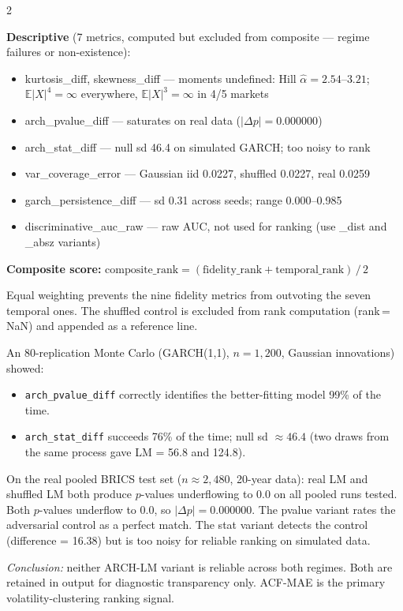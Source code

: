 \documentclass[10pt]{article}
\newcommand{\navybox}[2]{\begin{tcolorbox}[mybox={Navy}{LBg},title={#1}]#2\end{tcolorbox}}
\newcommand{\E}{\mathbb{E}}
\begin{document}
\begin{multicols}{2}
{\textbf{Descriptive} (7 metrics, computed but excluded from composite --- regime failures or non-existence):
\begin{itemize}[noitemsep,topsep=1pt]
  \item kurtosis\_diff, skewness\_diff --- moments undefined: Hill $\hat{\alpha}=2.54$--$3.21$; $\E|X|^4=\infty$ everywhere, $\E|X|^3=\infty$ in 4/5 markets
  \item arch\_pvalue\_diff --- saturates on real data ($|\Delta p|=0.000000$)
  \item arch\_stat\_diff --- null sd 46.4 on simulated GARCH; too noisy to rank
  \item var\_coverage\_error --- Gaussian iid 0.0227, shuffled 0.0227, real 0.0259
  \item garch\_persistence\_diff --- sd 0.31 across seeds; range 0.000--0.985
  \item discriminative\_auc\_raw --- raw AUC, not used for ranking (use \_dist and \_absz variants)
\end{itemize}

\textbf{Composite score:}
$\text{composite\_rank} = (\text{fidelity\_rank} + \text{temporal\_rank})\,/\,2$

Equal weighting prevents the nine fidelity metrics from outvoting the seven temporal ones. The shuffled control is excluded from rank computation (rank\,=\,NaN) and appended as a reference line.}

\navybox{ARCH-LM Regime Failure}{%
An 80-replication Monte Carlo (GARCH(1,1), $n=1{,}200$, Gaussian innovations) showed:
\begin{itemize}
  \item \texttt{arch\_pvalue\_diff} correctly identifies the better-fitting model 99\% of the time.
  \item \texttt{arch\_stat\_diff} succeeds 76\% of the time; null sd $\approx 46.4$ (two draws from the same process gave LM = 56.8 and 124.8).
\end{itemize}
On the real pooled BRICS test set ($n\approx2{,}480$, 20-year data): real LM and shuffled LM both produce $p$-values underflowing to 0.0 on all pooled runs tested. Both $p$-values underflow to 0.0, so $|\Delta p| = 0.000000$. The pvalue variant rates the adversarial control as a perfect match. The stat variant detects the control (difference = 16.38) but is too noisy for reliable ranking on simulated data.

\textit{Conclusion:} neither ARCH-LM variant is reliable across both regimes. Both are retained in output for diagnostic transparency only. ACF-MAE is the primary volatility-clustering ranking signal.}

\end{multicols}
\end{document}
